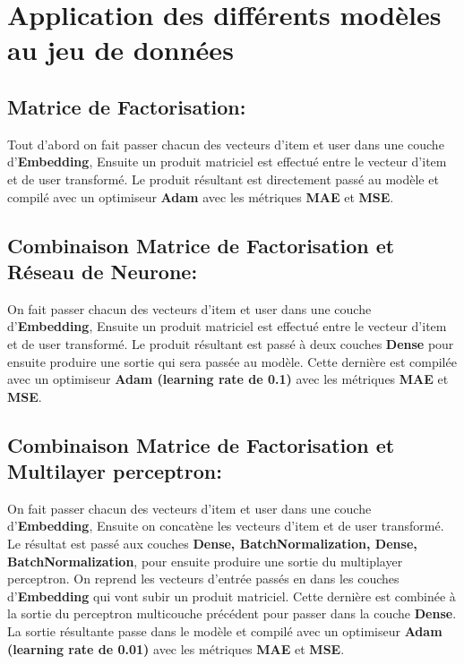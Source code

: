 \clearpage



\section{Application des différents modèles au jeu de données}
\subsection{Matrice de Factorisation:}
Tout d’abord on fait passer chacun des vecteurs d’item et user dans une couche d’\textbf{Embedding},
Ensuite un produit matriciel est effectué entre le vecteur d’item et de user transformé.
Le produit résultant est directement passé au modèle et compilé avec un optimiseur \textbf{Adam} avec les métriques \textbf{MAE} et \textbf{MSE}.

\subsection{Combinaison Matrice de Factorisation et Réseau de Neurone:}
On fait passer chacun des vecteurs d’item et user dans une couche d’\textbf{Embedding},
Ensuite un produit matriciel est effectué entre le vecteur d’item et de user transformé.
Le produit résultant est passé à deux couches \textbf{Dense} pour ensuite produire une sortie qui sera passée au modèle.
Cette dernière est compilée  avec un optimiseur \textbf{Adam (learning rate de 0.1)} avec les métriques \textbf{MAE} et \textbf{MSE}.

\subsection{Combinaison Matrice de Factorisation et Multilayer perceptron:}
On fait passer chacun des vecteurs d’item et user dans une couche d’\textbf{Embedding},
Ensuite on concatène les vecteurs d’item et de user transformé.
Le résultat est passé aux couches \textbf{Dense, BatchNormalization, Dense, BatchNormalization},  pour ensuite produire une sortie du multiplayer perceptron.
On reprend les vecteurs d’entrée passés en dans les couches d’\textbf{Embedding} qui vont subir un produit matriciel. Cette dernière est combinée à la sortie du perceptron multicouche précédent pour passer dans la couche \textbf{Dense}. La sortie résultante passe dans le modèle et compilé avec un optimiseur \textbf{Adam (learning rate de 0.01)} avec les métriques \textbf{MAE} et \textbf{MSE}.

